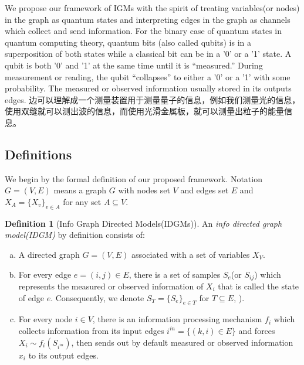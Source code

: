 \documentclass{article}
\theoremstyle{definition}
\newtheorem{definition}{Definition}[section]
\theoremstyle{remark}
\theoremstyle{definition}
\begin{document}
\begin{CJK*}{UTF8}{gbsn}
We propose our framework of IGMs with the spirit of treating variables(or nodes) in the graph as quantum states and interpreting edges in the graph as channels which collect and send information. For the binary case of quantum states in quantum computing theory, quantum bits (also called qubits) is in a superposition of both states while a classical bit can be in a '0' or a '1' state. A qubit is both '0' and '1' at the same time until it is “measured.” During measurement or reading, the qubit “collapses” to either a '0' or a '1' with some probability. The measured or observed information usually stored in its outputs edges. 边可以理解成一个测量装置用于测量量子的信息，例如我们测量光的信息，使用双缝就可以测出波的信息，而使用光滑金属板，就可以测量出粒子的能量信息。



\subsection{Definitions}

We begin by the formal definition of our proposed framework. Notation $G=(V, E)$ means a graph $G$ with nodes set $V$ and edges set $E$ and $X_A = \{X_v\}_{v\in A}$ for any set $A\subseteq V$.

\begin{definition}[Info Graph Directed Models(IDGMs)]
    An \emph{info directed graph model(IDGM)} by definition consists of:
    \begin{enumerate}[a)]
        \item  A directed graph $G = (V, E)$ associated with a set of variables $X_V$. 
        \item  For every edge $e=(i, j) \in E$, there is a set of samples $S_e$(or $S_{ij}$) which represents the measured or observed information of $X_i$ that is called the state of edge $e$. Consequently, we denote $S_T = \{S_e\}_{e \in T}$ for $T\subseteq E$,  ). 
        \item  For every node $i \in V$, there is an information processing mechanism $f_i$ which collects information from its input edges $i^{in} = \{(k, i) \in E \}$ and forces $X_i \sim f_i(S_{i^{in}})$, then sends out by default measured or observed information $x_i$ to its output edges. 
    \end{enumerate}  
\end{definition}



\end{CJK*}
\end{document}
